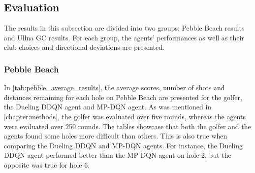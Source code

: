 \documentclass{kththesis}
\begin{document}
\subsection{Evaluation}
The results in this subsection are divided into two groups; Pebble Beach results and Ullna GC results. For each group, the agents' performances as well as their club choices and directional deviations are presented.

\subsubsection{Pebble Beach}
In \autoref{tab:pebble_average_results}, the average scores, number of shots and distances remaining for each hole on Pebble Beach are presented for the golfer, the Dueling DDQN agent and MP-DQN agent. As was mentioned in \autoref{chapter:methods}, the golfer was evaluated over five rounds, whereas the agents were evaluated over 250 rounds. The tables showcase that both the golfer and the agents found some holes more difficult than others. This is also true when comparing the Dueling DDQN and MP-DQN agents. For instance, the Dueling DDQN agent performed better than the MP-DQN agent on hole 2, but the opposite was true for hole 6.
\end{document}
